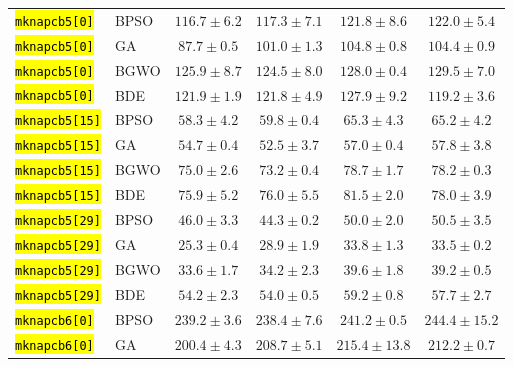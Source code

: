 \documentclass[mathematics,article,accept,moreauthors]{Definitions/mdpi}
\begin{document}
\begin{table}[H]
\begin{tabularx}{\textwidth}{XLCCCC}
    \midrule
    \texttt{\hl{mknapcb5[0]}} & BPSO  & $\mathbf{116.7 \pm 6.2}$ &          $117.3 \pm 7.1$ &          $121.8 \pm 8.6$ &          $122.0 \pm 5.4$ \\
    \texttt{\hl{mknapcb5[0]}} & GA    &  $\mathbf{87.7 \pm 0.5}$ &          $101.0 \pm 1.3$ &          $104.8 \pm 0.8$ &          $104.4 \pm 0.9$ \\
    \texttt{\hl{mknapcb5[0]}} & BGWO  &          $125.9 \pm 8.7$ & $\mathbf{124.5 \pm 8.0}$ &          $128.0 \pm 0.4$ &          $129.5 \pm 7.0$ \\
    \texttt{\hl{mknapcb5[0]}} & BDE   &          $121.9 \pm 1.9$ &          $121.8 \pm 4.9$ &          $127.9 \pm 9.2$ & $\mathbf{119.2 \pm 3.6}$ \\
    \midrule
    \texttt{\hl{mknapcb5[15]}} & BPSO  &  $\mathbf{58.3 \pm 4.2}$ &           $59.8 \pm 0.4$ &           $65.3 \pm 4.3$ &           $65.2 \pm 4.2$ \\
    \texttt{\hl{mknapcb5[15]}} & GA    &           $54.7 \pm 0.4$ &  $\mathbf{52.5 \pm 3.7}$ &           $57.0 \pm 0.4$ &           $57.8 \pm 3.8$ \\
    \texttt{\hl{mknapcb5[15]}} & BGWO  &           $75.0 \pm 2.6$ &  $\mathbf{73.2 \pm 0.4}$ &           $78.7 \pm 1.7$ &           $78.2 \pm 0.3$ \\
    \texttt{\hl{mknapcb5[15]}} & BDE   &  $\mathbf{75.9 \pm 5.2}$ &           $76.0 \pm 5.5$ &           $81.5 \pm 2.0$ &           $78.0 \pm 3.9$ \\
    \midrule
    \texttt{\hl{mknapcb5[29]}} & BPSO  &           $46.0 \pm 3.3$ &  $\mathbf{44.3 \pm 0.2}$ &           $50.0 \pm 2.0$ &           $50.5 \pm 3.5$ \\
    \texttt{\hl{mknapcb5[29]}} & GA    &  $\mathbf{25.3 \pm 0.4}$ &           $28.9 \pm 1.9$ &           $33.8 \pm 1.3$ &           $33.5 \pm 0.2$ \\
    \texttt{\hl{mknapcb5[29]}} & BGWO  &  $\mathbf{33.6 \pm 1.7}$ &           $34.2 \pm 2.3$ &           $39.6 \pm 1.8$ &           $39.2 \pm 0.5$ \\
    \texttt{\hl{mknapcb5[29]}} & BDE   &           $54.2 \pm 2.3$ &  $\mathbf{54.0 \pm 0.5}$ &           $59.2 \pm 0.8$ &           $57.7 \pm 2.7$ \\
    \midrule
    \texttt{\hl{mknapcb6[0]}} & BPSO  &          $239.2 \pm 3.6$ & $\mathbf{238.4 \pm 7.6}$ &          $241.2 \pm 0.5$ &         $244.4 \pm 15.2$ \\
    \texttt{\hl{mknapcb6[0]}} & GA    & $\mathbf{200.4 \pm 4.3}$ &          $208.7 \pm 5.1$ &         $215.4 \pm 13.8$ &          $212.2 \pm 0.7$ \\

\end{tabularx}
\end{table}
\end{document}
